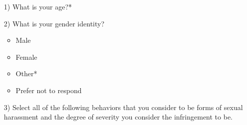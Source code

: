 \begin{adjustwidth}{0cm}{}
    \begin{itemize}
        \item [1)] What is your age?*
        \item [2)] What is your gender identity?
        \begin{itemize}
            \item Male
            \item Female
            \item Other*
            \item Prefer not to respond
        \end{itemize}
        \item [3)] Select all of the following behaviors that you consider to be forms of sexual harassment and the degree of severity you consider the infringement to be.
    \end{itemize}

    \end{adjustwidth}
    
